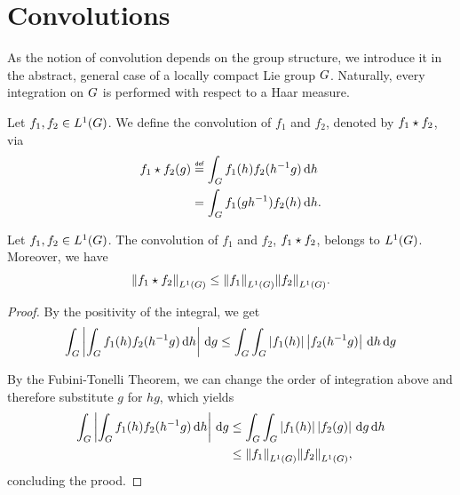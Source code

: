 \section{Convolutions}

As the notion of convolution depends on the group structure,
we introduce it in the abstract, general case of a locally compact Lie group $\Group$.
Naturally, every integration on $\Group$ is performed with respect to a Haar measure.

\begin{definition}[Convolution]
    Let $f_1, f_2 \in \Lebesgue 1 \Group$.
    We define the convolution of $f_1$ and $f_2$,
    denoted by $\conv {f_1} {f_2}$, via
    \begin{align}
        \conv {f_1} {f_2} (g)
        &\defeq \int_\Group f_1(h) f_2(h^{-1} g) \dd h
        \label{eq:definition_of_convolution}\\
        &= \int_\Group f_1(g h^{-1}) f_2(h) \dd h.
        \label{eq:alternative_definition_of_convolution}
    \end{align}
\end{definition}

\begin{proposition}
\label{proposition:integrability_of_the_convolution_of_two_L1_functions}
    Let $f_1, f_2 \in \Lebesgue 1 \Group$.
    The convolution of $f_1$ and $f_2$, $\conv {f_1} {f_2}$,
    belongs to $\Lebesgue 1 \Group$.
    Moreover, we have
    \begin{align*}
        \norm [\Lebesgue 1 \Group] {\conv {f_1} {f_2}}
        \leq
        \norm [\Lebesgue 1 \Group] {f_1}
        \norm [\Lebesgue 1 \Group] {f_2}.
    \end{align*}
\end{proposition}
\begin{proof}
    By the positivity of the integral,
    we get
    \begin{align*}
        \int_\Group \abs {\int_\Group f_1(h) f_2(h^{-1} g) \dd h} \dd g
        \leq \int_\Group \int_\Group \abs{f_1(h)} \abs{f_2(h^{-1} g)} \dd h \dd g
    \end{align*}

    By the Fubini-Tonelli Theorem,
    we can change the order of integration above
    and therefore substitute $g$ for $h g$,
    which yields
    \begin{align*}
        \int_\Group \abs {\int_\Group f_1(h) f_2(h^{-1} g) \dd h} \dd g
        &\leq \int_\Group \int_\Group \abs{f_1(h)} \abs{f_2(g)} \dd g \dd h\\
        &\leq \norm [\Lebesgue 1 \Group] {f_1} \norm [\Lebesgue 1 \Group] {f_2},
    \end{align*}
    concluding the prood.
\end{proof}

